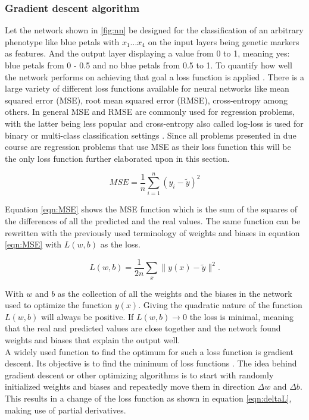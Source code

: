 \subsubsection{Gradient descent algorithm}

Let the network shown in \ref{fig:nn} be designed for the classification of an arbitrary phenotype like blue
petals with $x_1 \dots x_4$ on the input layers being genetic markers as features. And the output layer
displaying a value from 0 to 1, meaning yes: blue petals from 0 - 0.5 and no blue petals from 0.5 to 1. To
quantify how well the network performs on achieving that goal a loss function is applied
\cite{schmidhuber2015deep}. There is a large variety of different loss functions available for neural networks
like mean squared error (MSE), root mean squared error (RMSE), cross-entropy among others. In general MSE and
RMSE are commonly used for regression problems, with the latter being less popular and cross-entropy also
called log-loss is used for binary or multi-class classification settings \cite{janocha2017loss}. Since all
problems presented in due course are regression problems that use MSE as their loss function this will be the
only loss function further elaborated upon in this section.

\begin{equation}
 MSE = \frac{1}{n} \sum_{i=1}^n (y_i - \widetilde{y})^2
 \label{eqn:MSE}
\end{equation}


Equation \ref{eqn:MSE} shows the MSE function which is the sum of the squares of the differences of all the
predicted and the real values. The same function can be rewritten with the previously used terminology of
weights and biases in equation \ref{eqn:MSE} with $L(w,b)$ as the loss.

\begin{equation}
 L(w,b) = \frac{1}{2n} \sum_x \| y(x) - \widetilde{y}\|^2.
 \label{eqn:MSE2}
\end{equation}


With $w$ and $b$ as the collection of all the weights and the biases in the network used to optimize the
function $y(x)$. Giving the quadratic nature of the function $L(w,b)$ will always be positive. If
$L(w,b) \rightarrow 0$ the loss is minimal, meaning that the real and predicted values are close together and
the network found weights and biases that explain the output well. \\
A widely used function to find the optimum for such a loss function is gradient descent. Its objective is to
find the minimum of loss functions \cite{bottou1991stochastic}. The idea behind gradient descent or other
optimizing algorithms is to start with randomly initialized weights and biases and repeatedly move them in
direction $\Delta w$ and $\Delta b$. This results in a change of the loss function as shown in equation
\ref{eqn:deltaL}, making use of partial derivatives.

